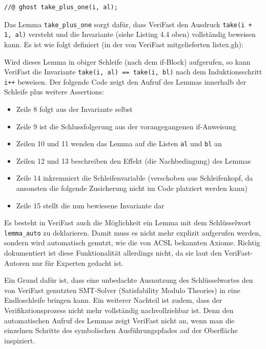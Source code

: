 \lstset{frame=none, numbers=none}                      
\begin{lstlisting}
//@ ghost take_plus_one(i, al);
\end{lstlisting}
\lstset{frame=single, numbers=left}    
Das Lemma \lstinline{take_plus_one} sorgt dafür, dass VeriFast den Ausdruck \lstinline{take(i + 1, al)}
versteht und die Invariante (siehe Listing 4.4 oben) vollständig beweisen kann. Es ist wie folgt
definiert (in der von VeriFast mitgelieferten listex.gh):
\begin{figure}[H]

\end{figure}
Wird dieses Lemma in obiger Schleife (nach dem if-Block) aufgerufen, so kann VeriFast
die Invariante \lstinline{take(i, al) == take(i, bl)} nach dem Induktionsschritt \lstinline{i++}
beweisen. Der folgende Code zeigt den Aufruf des Lemmas innerhalb der Schleife plus weitere Assertions:
\begin{itemize}
\item Zeile 8 folgt aus der Invariante selbst
\item Zeile 9 ist die Schlussfolgerung aus der vorangegangenen if-Anweisung
\item Zeilen 10 und 11 wenden das Lemma auf die Listen \lstinline{al} und \lstinline{bl} an
\item Zeilen 12 und 13 beschreiben den Effekt (die Nachbedingung) des Lemmas
\item Zeile 14 inkremniert die Schleifenvariable (verschoben aus Schleifenkopf, da ansonsten die folgende Zusicherung nicht im Code platziert werden kann)
\item Zeile 15 stellt die nun bewiesene Invariante dar
\end{itemize}



Es besteht in VeriFast auch die Möglichkeit ein Lemma mit dem Schlüsselwort \lstinline{lemma_auto} zu deklarieren.
Damit muss es nicht mehr explizit aufgerufen werden, sondern wird automatisch genutzt, wie die von 
ACSL bekannten Axiome. Richtig dokumentiert ist diese Funktionalität allerdings nicht, da sie laut den VeriFast-Autoren
nur für Experten gedacht ist. 

Ein Grund dafür ist, dass eine unbedachte Ausnutzung des Schlüsselwortes
den von VeriFast genutzten SMT-Solver (Satisfability Modulo Theories) in eine Endloschleife bringen kann. Ein
weiterer Nachteil ist zudem, dass der Verifikationsprozess nicht mehr vollständig nachvollziehbar ist.
Denn den automatischen Aufruf des Lemmas zeigt VeriFast nicht an, wenn man die einzelnen
Schritte des symbolischen Ausführungspfades auf der Oberfläche inspiziert.

